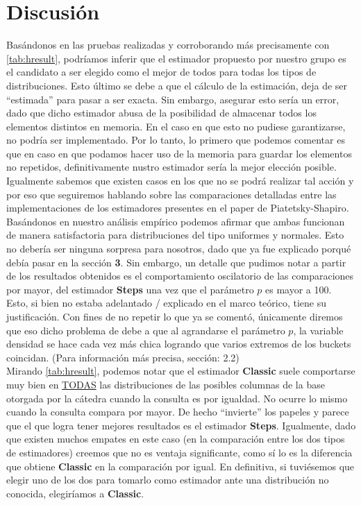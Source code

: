 \section{Discusión}
Basándonos en las pruebas realizadas y corroborando más precisamente con \ref{tab:hresult}, podríamos inferir que el estimador propuesto por nuestro grupo es el candidato a ser elegido como el mejor de todos para todas los tipos de distribuciones. Esto último se debe a que el cálculo de la estimación, deja de ser ``estimada'' para pasar a ser exacta. Sin embargo, asegurar esto sería un error, dado que dicho estimador abusa de la posibilidad de  almacenar todos los elementos distintos en memoria. En el caso en que esto no pudiese garantizarse, no podría ser implementado. Por lo tanto, lo primero que podemos comentar es que en caso en que podamos hacer uso de la memoria para guardar los elementos no repetidos, definitivamente nustro estimador sería la mejor elección posible.\\
Igualmente sabemos que existen casos en los que no se podrá realizar tal acción y por eso que seguiremos hablando sobre las comparaciones detalladas entre las implementaciones de los estimadores presentes en el paper de Piatetsky-Shapiro. \\
Basándonos en nuestro análisis empírico podemos afirmar que ambas funcionan de manera satisfactoria para distribuciones del tipo uniformes y normales. Esto no debería ser ninguna sorpresa para nosotros, dado que ya fue explicado porqué debía pasar en la sección \textbf{3}. Sin embargo, un detalle que pudimos notar a partir de los resultados obtenidos es el comportamiento oscilatorio de las comparaciones por mayor, del estimador \textbf{Steps} una vez que el parámetro $p$ es mayor a 100. Esto, si bien no estaba adelantado / explicado en el marco teórico, tiene su justificación. Con fines de no repetir lo que ya se comentó, únicamente diremos que eso dicho problema de debe a que al agrandarse el parámetro $p$, la variable densidad se hace cada vez más chica logrando que varios extremos de los buckets coincidan. (Para información más precisa, sección: 2.2)  \\
Mirando \ref{tab:hresult}, podemos notar que el estimador \textbf{Classic} suele comportarse muy bien en \underline{TODAS} las distribuciones de las posibles columnas de la base otorgada por la cátedra cuando la consulta es por igualdad. No ocurre lo mismo cuando la consulta compara por mayor. De hecho ``invierte'' los papeles y parece que el que logra tener mejores resultados es el estimador \textbf{Steps}. Igualmente, dado que existen muchos empates en este caso (en la comparación entre los dos tipos de estimadores) creemos que no es ventaja significante, como sí lo es la diferencia que obtiene \textbf{Classic} en la comparación por igual. En definitiva, si tuviésemos que elegir uno de los dos para tomarlo como estimador ante una distribución no conocida, elegiríamos a \textbf{Classic}. \\
